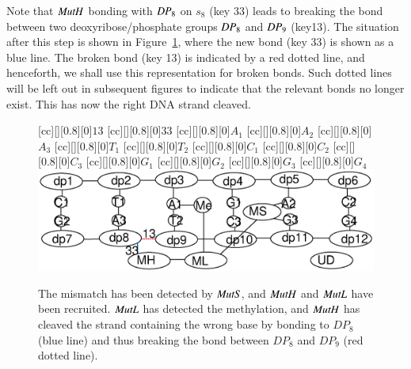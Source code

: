 Note that $\mathit{MutH}$ bonding with $\mathit{DP}_8$ on $s_8$ (key 33) leads to breaking the bond between two deoxyribose/phosphate groups $\mathit{DP}_8$ and $\mathit{DP}_9$ (key13). 
%
%
The situation after this step is shown in Figure~\ref{fig:state2}, where the new bond (key 33) is shown as a blue line. The broken bond (key 13) is indicated by a red dotted line, and henceforth, we shall use this representation for broken bonds. Such dotted lines will be left out in subsequent figures to indicate that the relevant bonds no longer exist.  This has now the right DNA strand cleaved.

\begin{figure}[h!]
[cc][][0.8][0]{$13$}
[cc][][0.8][0]{$33$}
[cc][][0.8][0]{$A_1$}
[cc][][0.8][0]{$A_2$}
[cc][][0.8][0]{$A_3$}
[cc][][0.8][0]{$T_1$}
[cc][][0.8][0]{$T_2$}
[cc][][0.8][0]{$C_1$}
[cc][][0.8][0]{$C_2$}
[cc][][0.8][0]{$C_3$}
[cc][][0.8][0]{$G_1$}
[cc][][0.8][0]{$G_2$}
[cc][][0.8][0]{$G_3$}
[cc][][0.8][0]{$G_4$}
  \centering
    \includegraphics[width=1.0\textwidth]{mmr/state2}
  \caption[A six base pair DNA fragment.]{%
  The mismatch has been detected by $\mathit{MutS}$, and $\mathit{MutH}$ and $\mathit{MutL}$ have been recruited. $\mathit{MutL}$ has detected the methylation, and $\mathit{MutH}$ has cleaved the strand containing the wrong base by bonding to $DP_8$ (blue line) and thus breaking the bond between $DP_8$ and $DP_9$ (red dotted line).}
  \label{fig:state2}
\end{figure}

